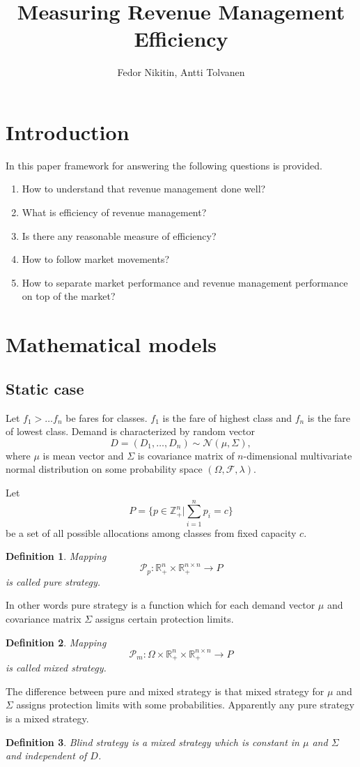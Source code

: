 \documentclass[a4paper,oneside]{article}
\title{Measuring Revenue Management Efficiency}
\author{Fedor Nikitin, Antti Tolvanen}
\newtheorem{defi}{Definition}
\begin{document}
  \maketitle
  
  \section{Introduction}
  In this paper framework for answering the following questions is provided.
  \begin{enumerate}
    \item How to understand that revenue management done well?
    \item What is efficiency of revenue management?
    \item Is there any reasonable measure of efficiency?
    \item How to follow market movements?
    \item How to separate market performance and revenue management performance on top of the market?
  \end{enumerate}

  \section{Mathematical models}
  \subsection{Static case}
  Let $f_1 > \ldots f_n$ be fares for classes. $f_1$ is the fare of highest class and
  $f_n$ is the fare of lowest class. Demand is characterized by random vector
  $$
  D = (D_1,\ldots,D_n) \sim \mathcal{N}(\mu,\Sigma),
  $$
  where $\mu$ is mean vector and $\Sigma$ is covariance matrix of $n$-dimensional
  multivariate normal distribution on some probability space $(\Omega,\mathcal{F},\lambda)$.

  Let 
  $$
  P = \{ p \in \mathbb{Z}_+^n | \sum_{i=1}^n p_i = c \}
  $$
  be a set of all possible allocations among classes from fixed capacity $c$.
  \begin{defi} Mapping
  $$
  \mathcal{P}_p : \mathbb{R}_+^n \times \mathbb{R}_+^{n\times n} \rightarrow P
  $$
  is called pure strategy.
  \end{defi}
  In other words pure strategy is a function which for each demand vector $\mu$ and covariance matrix $\Sigma$
  assigns certain protection limits.
  \begin{defi} Mapping
  $$
  \mathcal{P}_m : \Omega \times \mathbb{R}_+^n \times \mathbb{R}_+^{n\times n} \rightarrow P
  $$
  is called mixed strategy.
  \end{defi}
  The difference between pure and mixed strategy is that mixed strategy for $\mu$ and $\Sigma$ assigns
  protection limits with some probabilities. Apparently any pure strategy is a mixed strategy.
  \begin{defi}
  Blind strategy is a mixed strategy which is constant in $\mu$ and $\Sigma$ and independent of $D$.
  \end{defi}
\end{document}
